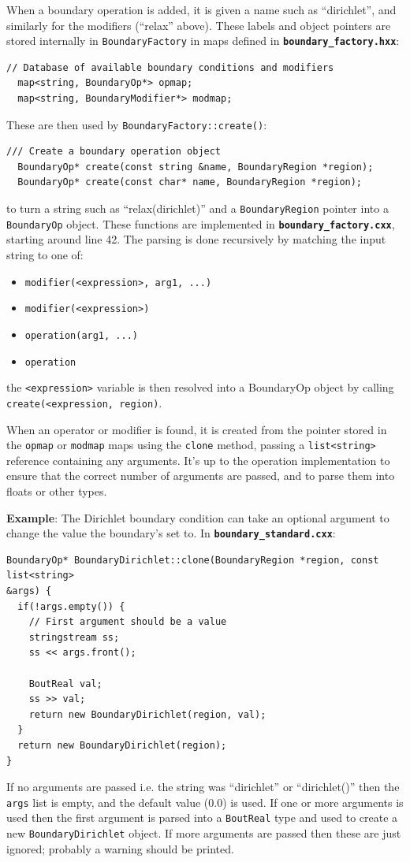 \documentclass[12pt]{article}
\newcommand{\code}[1]{\texttt{#1}}
\newcommand{\file}[1]{\texttt{\bf #1}}
\begin{document}
When a boundary operation is added, it is given a name such as ``dirichlet'',
and similarly for the modifiers (``relax'' above).  These labels and object
pointers are stored internally in \code{BoundaryFactory} in maps defined in
\file{boundary\_factory.hxx}:
%
\begin{lstlisting}[firstnumber=43]
  // Database of available boundary conditions and modifiers
  map<string, BoundaryOp*> opmap;
  map<string, BoundaryModifier*> modmap;
\end{lstlisting}
%
These are then used by \code{BoundaryFactory::create()}:
%
\begin{lstlisting}[firstnumber=24]
  /// Create a boundary operation object
  BoundaryOp* create(const string &name, BoundaryRegion *region);
  BoundaryOp* create(const char* name, BoundaryRegion *region);
\end{lstlisting}
%
to turn a string such as ``relax(dirichlet)'' and a \code{BoundaryRegion}
pointer into a \code{BoundaryOp} object. These functions are implemented in
\file{boundary\_factory.cxx}, starting around line 42. The parsing is done
recursively by matching the input string to one of:
%
\begin{itemize}
\item \code{modifier(<expression>, arg1, ...)}
\item \code{modifier(<expression>)}
\item \code{operation(arg1, ...)}
\item \code{operation}
\end{itemize}
%
the \code{<expression>} variable is then resolved into a BoundaryOp object by
calling \code{create(<expression, region)}.

When an operator or modifier is found, it is created from the pointer stored in
the \code{opmap} or \code{modmap} maps using the \code{clone} method, passing a
\code{list<string>} reference containing any arguments. It's up to the
operation implementation to ensure that the correct number of arguments are
passed, and to parse them into floats or other types.

{\bf Example}: The Dirichlet boundary condition can take an optional argument
to change the value the boundary's set to. In \file{boundary\_standard.cxx}:
%
%
\begin{lstlisting}[firstnumber=13]
BoundaryOp* BoundaryDirichlet::clone(BoundaryRegion *region, const list<string>
&args) {
  if(!args.empty()) {
    // First argument should be a value
    stringstream ss;
    ss << args.front();

    BoutReal val;
    ss >> val;
    return new BoundaryDirichlet(region, val);
  }
  return new BoundaryDirichlet(region);
}
\end{lstlisting}
%
If no arguments are passed i.e. the string was ``dirichlet'' or ``dirichlet()''
then the \code{args} list is empty, and the default value (0.0) is used.  If
one or more arguments is used then the first argument is parsed into a
\code{BoutReal} type and used to create a new \code{BoundaryDirichlet} object.
If more arguments are passed then these are just ignored; probably a warning
should be printed.
\end{document}
